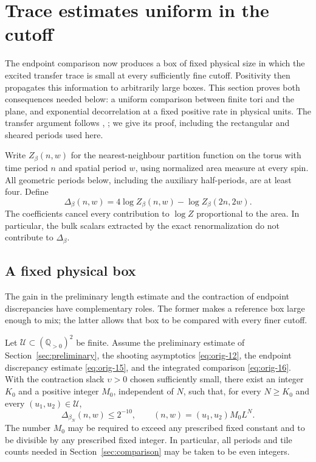 \section{Trace estimates uniform in the cutoff}
\label{sec:trace}

The endpoint comparison now produces a box of fixed physical size in
which the excited transfer trace is small at every sufficiently fine
cutoff.  Positivity then propagates this information to arbitrarily
large boxes.  This section proves both consequences needed below: a
uniform comparison between finite tori and the plane, and exponential
decorrelation at a fixed positive rate in physical units.  The transfer
argument follows \cite{OpenAI-O4}, ; we give its
proof, including the rectangular and sheared periods used here.

Write $Z_\beta(n,w)$ for the nearest-neighbour partition function on the
torus with time period $n$ and spatial period $w$, using normalized area
measure at every spin.  All geometric periods below, including the
auxiliary half-periods, are at least four.  Define
\begin{equation}
 \Delta_\beta(n,w)
   =4\log Z_\beta(n,w)-\log Z_\beta(2n,2w).
 \label{eq:trace-doubling-definition}
\end{equation}
The coefficients cancel every contribution to $\log Z$ proportional to
the area.  In particular, the bulk scalars extracted by the exact
renormalization do not contribute to $\Delta_\beta$.

\subsection{A fixed physical box}

The gain in the preliminary length estimate and the contraction of
endpoint discrepancies have complementary roles.  The former makes a
reference box large enough to mix; the latter allows that box to be
compared with every finer cutoff.

\begin{proposition}
\label{prop:trace-small-box}
Let $\mathcal U\subset(\mathbb Q_{>0})^2$ be finite.  Assume the
preliminary estimate of Section~\ref{sec:preliminary}, the shooting
asymptotics \eqref{eq:orig-12}, the endpoint discrepancy estimate
\eqref{eq:orig-15}, and the integrated comparison
\eqref{eq:orig-16}.  With the contraction slack $\upsilon>0$ chosen
sufficiently small, there exist an integer $K_0$ and a positive integer
$M_0$, independent of $N$, such that, for every $N\ge K_0$ and every
$(u_1,u_2)\in\mathcal U$,
\begin{equation}
 \Delta_{\beta_N}(n,w)\le 2^{-10},
 \qquad (n,w)=(u_1,u_2)M_0L^N.
 \label{eq:orig-24}
\end{equation}
The number $M_0$ may be required to exceed any prescribed fixed constant
and to be divisible by any prescribed fixed integer.  In particular,
all periods and tile counts needed in
Section~\ref{sec:comparison} may be taken to be even integers.
\end{proposition}

